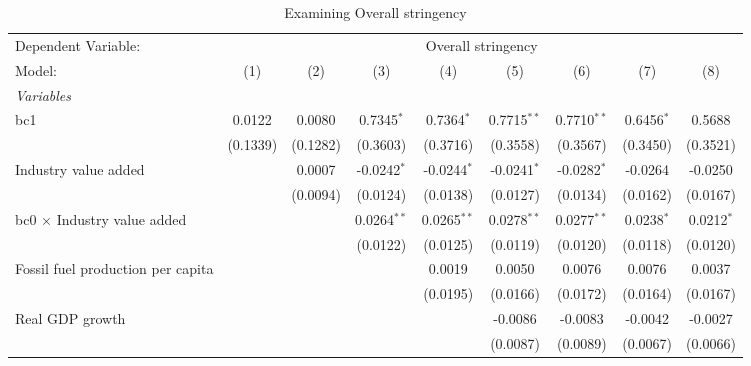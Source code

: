 
\begin{table}[htbp]
   \caption{Examining Overall stringency}
   \centering
   \begin{tabular}{lcccccccc}
      \tabularnewline \midrule \midrule
      Dependent Variable: & \multicolumn{8}{c}{Overall stringency}\\
      Model:                                  & (1)      & (2)      & (3)           & (4)           & (5)           & (6)           & (7)          & (8)\\  
      \midrule
      \emph{Variables}\\
      bc1                                     & 0.0122   & 0.0080   & 0.7345$^{*}$  & 0.7364$^{*}$  & 0.7715$^{**}$ & 0.7710$^{**}$ & 0.6456$^{*}$ & 0.5688\\   
                                              & (0.1339) & (0.1282) & (0.3603)      & (0.3716)      & (0.3558)      & (0.3567)      & (0.3450)     & (0.3521)\\   
      Industry value added                    &          & 0.0007   & -0.0242$^{*}$ & -0.0244$^{*}$ & -0.0241$^{*}$ & -0.0282$^{*}$ & -0.0264      & -0.0250\\   
                                              &          & (0.0094) & (0.0124)      & (0.0138)      & (0.0127)      & (0.0134)      & (0.0162)     & (0.0167)\\   
      bc0 $\times$ Industry value added       &          &          & 0.0264$^{**}$ & 0.0265$^{**}$ & 0.0278$^{**}$ & 0.0277$^{**}$ & 0.0238$^{*}$ & 0.0212$^{*}$\\   
                                              &          &          & (0.0122)      & (0.0125)      & (0.0119)      & (0.0120)      & (0.0118)     & (0.0120)\\   
      Fossil fuel production per capita       &          &          &               & 0.0019        & 0.0050        & 0.0076        & 0.0076       & 0.0037\\   
                                              &          &          &               & (0.0195)      & (0.0166)      & (0.0172)      & (0.0164)     & (0.0167)\\   
      Real GDP growth                         &          &          &               &               & -0.0086       & -0.0083       & -0.0042      & -0.0027\\   
                                              &          &          &               &               & (0.0087)      & (0.0089)      & (0.0067)     & (0.0066)\\   

\end{tabular}
\end{table}
